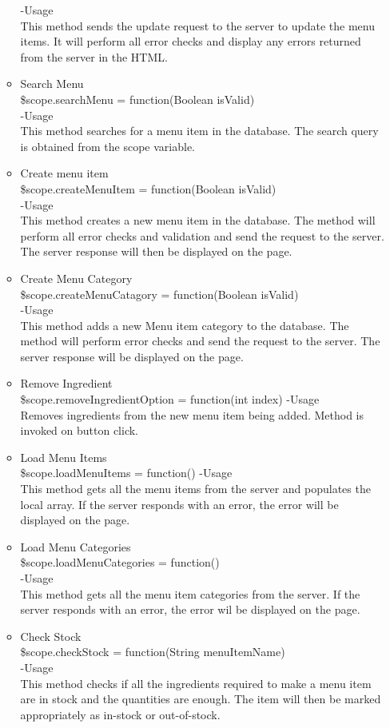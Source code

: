\documentclass[a4paper,12pt]{article}
\begin{document}
\begin{enumerate}
\begin{itemize}
		-Usage\\
		This method sends the update request to the server to update the menu items. It will perform all error checks and display any errors returned from the server in the HTML.
		\item Search Menu\\
		\$scope.searchMenu = function(Boolean isValid)\\
		-Usage\\
		This method searches for a menu item in the database. The search query is obtained from the scope variable.
		\item Create menu item\\
		\$scope.createMenuItem = function(Boolean isValid)\\
		-Usage\\
		This method creates a new menu item in the database. The method will perform all error checks and validation and send the request to the server. The server response will then be displayed on the page.
		\item Create Menu Category\\
		\$scope.createMenuCatagory = function(Boolean isValid)\\
		-Usage\\
		This method adds a new Menu item category to the database. The method will perform error checks and send the request to the server. The server response will be displayed on the page.
		\item Remove Ingredient\\
		\$scope.removeIngredientOption = function(int index)
		-Usage\\
		Removes ingredients from the  new menu item being added. Method is invoked on button click.
		\item Load Menu Items\\
		\$scope.loadMenuItems = function()
		-Usage\\
		This method gets all the menu items from the server and populates the local array. If the server responds with an error, the error will be displayed on the page.
		\item Load Menu Categories\\
		\$scope.loadMenuCategories = function()\\
		-Usage\\
		This method gets all the menu item categories from the server. If the server responds with an error, the error wil be displayed on the page.
		\item Check Stock\\
		\$scope.checkStock = function(String menuItemName)\\
		-Usage\\
		This method checks if all the ingredients required to make a menu item are in stock and the quantities are enough. The item will then be marked appropriately as in-stock or out-of-stock.
	\end{itemize}
	
\end{enumerate}
\end{document}
